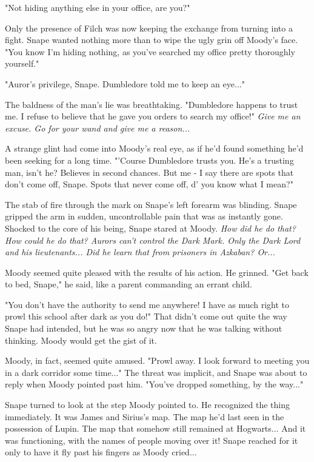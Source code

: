 "Not hiding anything else in your office, are you?"

Only the presence of Filch was now keeping the exchange from turning into a fight. Snape wanted nothing more than to wipe the ugly grin off Moody's face. "You know I'm hiding nothing, as you've searched my office pretty thoroughly yourself."

"Auror's privilege, Snape. Dumbledore told me to keep an eye..."

The baldness of the man's lie was breathtaking. "Dumbledore happens to trust me. I refuse to believe that he gave you orders to search my office!" \emph{Give me an excuse. Go for your wand and give me a reason...}

A strange glint had come into Moody's real eye, as if he'd found something he'd been seeking for a long time. "'Course Dumbledore trusts you. He's a trusting man, isn't he? Believes in second chances. But me - I say there are spots that don't come off, Snape. Spots that never come off, d' you know what I mean?"

The stab of fire through the mark on Snape's left forearm was blinding. Snape gripped the arm in sudden, uncontrollable pain that was as instantly gone. Shocked to the core of his being, Snape stared at Moody. \emph{How did he do that? How could he do that? Aurors can't control the Dark Mark. Only the Dark Lord and his lieutenants... Did he learn that from prisoners in Azkaban? Or...}

Moody seemed quite pleased with the results of his action. He grinned. "Get back to bed, Snape," he said, like a parent commanding an errant child.

"You don't have the authority to send me anywhere! I have as much right to prowl this school after dark as you do!" That didn't come out quite the way Snape had intended, but he was so angry now that he was talking without thinking. Moody would get the gist of it.

Moody, in fact, seemed quite amused. "Prowl away. I look forward to meeting you in a dark corridor some time..." The threat was implicit, and Snape was about to reply when Moody pointed past him. "You've dropped something, by the way..."

Snape turned to look at the step Moody pointed to. He recognized the thing immediately. It was James and Sirius's map. The map he'd last seen in the possession of Lupin. The map that somehow still remained at Hogwarts... And it was functioning, with the names of people moving over it! Snape reached for it only to have it fly past his fingers as Moody cried...

